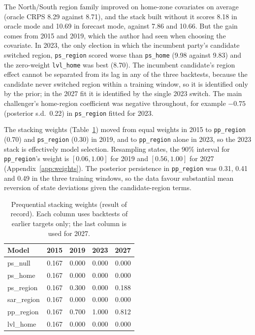 \documentclass[preprint,12pt,authoryear]{elsarticle}
\begin{document}
The North/South region family improved on home-zone covariates on average (oracle CRPS 8.29 against 8.71), and the stack built without it scores 8.18 in oracle mode and 10.69 in forecast mode, against 7.86 and 10.66. But the gain comes from 2015 and 2019, which the author had seen when choosing the covariate. In 2023, the only election in which the incumbent party's candidate switched region, \texttt{ps\_region} scored worse than \texttt{ps\_home} (9.98 against 9.83) and the zero-weight \texttt{lvl\_home} was best (8.70). The incumbent candidate's region effect cannot be separated from its lag in any of the three backtests, because the candidate never switched region within a training window, so it is identified only by the prior; in the 2027 fit it is identified by the single 2023 switch. The main challenger's home-region coefficient was negative throughout, for example $-0.75$ (posterior s.d.\ 0.22) in \texttt{ps\_region} fitted for 2023.

The stacking weights (Table~\ref{tab:weights}) moved from equal weights in 2015 to \texttt{pp\_region} (0.70) and \texttt{ps\_region} (0.30) in 2019, and to \texttt{pp\_region} alone in 2023, so the 2023 stack is effectively model selection. Resampling states, the 90\% interval for \texttt{pp\_region}'s weight is $[0.06, 1.00]$ for 2019 and $[0.56, 1.00]$ for 2027 (Appendix~\ref{app:weights}). The posterior persistence in \texttt{pp\_region} was 0.31, 0.41 and 0.49 in the three training windows, so the data favour substantial mean reversion of state deviations given the candidate-region terms.

\begin{table}[ht]
\centering
\caption{Prequential stacking weights (result of record). Each column uses backtests of earlier targets only; the last column is used for 2027.}
\label{tab:weights}
\begin{tabular}{lrrrr}
\toprule
Model & 2015 & 2019 & 2023 & 2027 \\
\midrule
ps\_null & 0.167 & 0.000 & 0.000 & 0.000 \\
ps\_home & 0.167 & 0.000 & 0.000 & 0.000 \\
ps\_region & 0.167 & 0.300 & 0.000 & 0.188 \\
sar\_region & 0.167 & 0.000 & 0.000 & 0.000 \\
pp\_region & 0.167 & 0.700 & 1.000 & 0.812 \\
lvl\_home & 0.167 & 0.000 & 0.000 & 0.000 \\
\bottomrule
\end{tabular}
\end{table}
\end{document}
